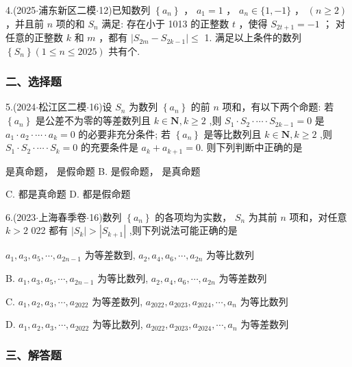 4.(2025$\cdot$浦东新区二模$\cdot$12)已知数列 $\left\{  {a}_{n}\right\}$ ， ${a}_{1} = 1$ ， ${a}_{n} \in  \{ 1, - 1\}$ ， $\left( {n \geq  2}\right)$ ，并且前 $n$ 项的和 ${S}_{n}$ 满足:    存在小于 1013 的正整数 $t$ ，使得 ${S}_{{2t} + 1} =  - 1$ ；   对任意的正整数 $k$ 和 $m$ ，都有 $\left| {{S}_{2m} - {S}_{{2k} - 1}}\right|  \leq$ 1. 满足以上条件的数列 $\left\{  {S}_{n}\right\}  \left( {1 \leq  n \leq  {2025}}\right)$ 共有\blkda[2]{}个.

\subsubsection*{二、选择题}

5.(2024$\cdot$松江区二模$\cdot$16)设 ${S}_{n}$ 为数列 $\left\{  {a}_{n}\right\}$ 的前 $n$ 项和，有以下两个命题:   若 $\left\{  {a}_{n}\right\}$ 是公差不为零的等差数列且 $k \in  \mathbf{N},k \geq  2$ ,则 ${S}_{1} \cdot  {S}_{2} \cdot  \cdots  \cdot  {S}_{{2k} - 1} = 0$ 是 ${a}_{1} \cdot  {a}_{2} \cdot  \cdots  \cdot  {a}_{k} = 0$ 的必要非充分条件;    若 $\left\{  {a}_{n}\right\}$ 是等比数列且 $k \in  \mathbf{N},k \geq  2$ ,则 ${S}_{1} \cdot  {S}_{2} \cdot  \cdots  \cdot  {S}_{k} = 0$ 的充要条件是 ${a}_{k} + {a}_{k + 1} = 0$. 则下列判断中正确的是 \dotfill{(\kh{})}

\xx{}{}{}{}  是真命题，  是假命题 B.   是假命题，  是真命题

C.     都是真命题 D.     都是假命题

6.(2023$\cdot$上海春季卷$\cdot$16)数列 $\left\{  {a}_{n}\right\}$ 的各项均为实数， ${S}_{n}$ 为其前 $n$ 项和，对任意 $k > 2$ 022 都有 $\left| {S}_{k}\right|  > \left| {S}_{k + 1}\right|$ ,则下列说法可能正确的是 \dotfill{(\kh{})}

\xx{}{}{}{}${a}_{1},{a}_{3},{a}_{5},\cdots ,{a}_{{2n} - 1}$ 为等差数到, ${a}_{2},{a}_{4},{a}_{6},\cdots ,{a}_{2n}$ 为等比数列

B. ${a}_{1},{a}_{3},{a}_{5},\cdots ,{a}_{{2n} - 1}$ 为等比数列, ${a}_{2},{a}_{4},{a}_{6},\cdots ,{a}_{2n}$ 为等差数列

C. ${a}_{1},{a}_{2},{a}_{3},\cdots ,{a}_{2022}$ 为等差数列, ${a}_{2022},{a}_{2023},{a}_{2024},\cdots ,{a}_{n}$ 为等比数列

D. ${a}_{1},{a}_{2},{a}_{3},\cdots ,{a}_{2022}$ 为等比数列, ${a}_{2022},{a}_{2023},{a}_{2024},\cdots ,{a}_{n}$ 为等差数列

\subsubsection*{三、解答题}

